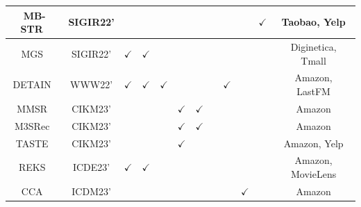 \documentclass[lettersize,journal]{IEEEtran}
\begin{document}
\begin{table}[!th]
\begin{tabular}{c|c|c|c|    c|c|c|c|    c|c|c|c}
 \hline
 {MB-STR~\cite{yuan@SIGIR2022}}    & {SIGIR22'}    &{}    & {}   & {}   & {}  & {}   & {}  & {}  & {}  & {$\checkmark$}    & {Taobao, Yelp} \\  
 \hline
 {MGS~\cite{lai@SIGIR2022}}    & {SIGIR22'}    &{$\checkmark$}    & {$\checkmark$}   & {}   & {}  & {}   & {}  & {}  & {}  & {}    & {Diginetica, Tmall} \\  
 \hline
 {DETAIN~\cite{lin@WWW2022}}    & {WWW22'}    &{$\checkmark$}    & {$\checkmark$}   & {$\checkmark$}   & {}  & {}   & {}   & {$\checkmark$}  & {}  & {}    & {Amazon, LastFM} \\  
 \hline

 
 {MMSR~\cite{Hu@CIKM2023}}    & {CIKM23'}    &{}    & {}   & {}   & {$\checkmark$}  & {$\checkmark$}   & {}  & {}  & {}  & {}    & {Amazon} \\
 \hline
 {M3SRec~\cite{Bian@CIKM2023}}    & {CIKM23'}    &{}    & {}   & {}   & {$\checkmark$}  & {$\checkmark$}    & {}  & {}  & {}  & {}    & {Amazon} \\
\hline
{TASTE~\cite{Liu@CIKM2023Text}}    & {CIKM23'}    &{}    & {}   & {}   & {$\checkmark$}  & {}   & {}  & {}  & {}  & {}    & {Amazon, Yelp} \\
 \hline
 {REKS~\cite{Wu@ICDE2023}}    & {ICDE23'}    &{$\checkmark$}    & {$\checkmark$}   & {}   & {}  & {}  & {}   & {}  & {}  & {}    & {Amazon, MovieLens} \\
 \hline
{CCA~\cite{Huang@ICDM2023}}    & {ICDM23'}    &{}    & {}   & {}   & {}  & {}  & {}  & {}    & {$\checkmark$}  & {}    & {Amazon} \\ 
 \hline
 


\end{tabular}
\end{table}
\end{document}
